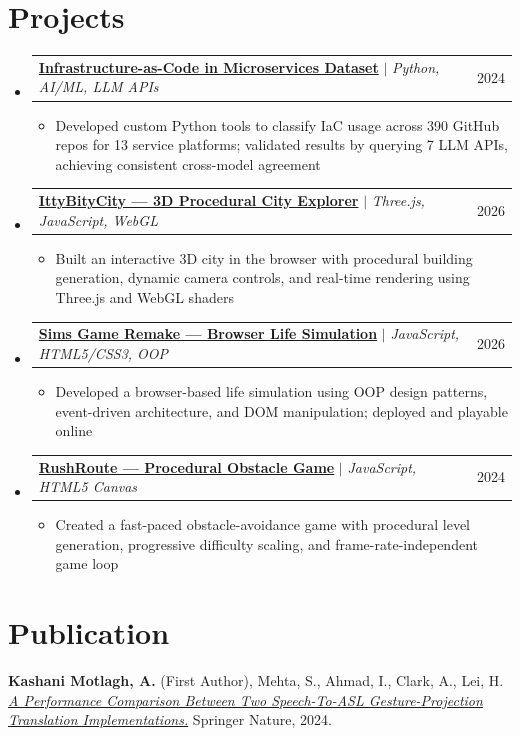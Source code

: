 \documentclass[letterpaper,10.5pt]{article}
\makeatletter
\newcommand{\resumeItem}[1]{
  \item\small{
    {#1 \vspace{-2pt}}
  }
}
\newcommand{\resumeProjectHeading}[2]{
    \item
    \begin{tabular*}{0.97\textwidth}{l@{\extracolsep{\fill}}r}
      \small#1 & #2 \\
    \end{tabular*}\vspace{-7pt}
}
\newcommand{\resumeSubHeadingListStart}{\begin{itemize}[leftmargin=0.15in, label={}]}
\newcommand{\resumeSubHeadingListEnd}{\end{itemize}}
\newcommand{\resumeItemListStart}{\begin{itemize}}
\newcommand{\resumeItemListEnd}{\end{itemize}\vspace{-5pt}}
\makeatother
\begin{document}
\section{Projects}
    \resumeSubHeadingListStart
      \resumeProjectHeading
          {\textbf{\href{https://github.com/kashmot2/FINALBASELINE}{Infrastructure-as-Code in Microservices Dataset}} $|$ \emph{Python, AI/ML, LLM APIs}}{2024}
          \resumeItemListStart
            \resumeItem{Developed custom Python tools to classify IaC usage across 390 GitHub repos for 13 service platforms; validated results by querying 7 LLM APIs, achieving consistent cross-model agreement}
          \resumeItemListEnd
      \resumeProjectHeading
          {\textbf{\href{https://github.com/kashmot2/ittybitycity}{IttyBityCity --- 3D Procedural City Explorer}} $|$ \emph{Three.js, JavaScript, WebGL}}{2026}
          \resumeItemListStart
            \resumeItem{Built an interactive 3D city in the browser with procedural building generation, dynamic camera controls, and real-time rendering using Three.js and WebGL shaders}
          \resumeItemListEnd
      \resumeProjectHeading
          {\textbf{\href{https://github.com/kashmot2/Sims}{Sims Game Remake --- Browser Life Simulation}} $|$ \emph{JavaScript, HTML5/CSS3, OOP}}{2026}
          \resumeItemListStart
            \resumeItem{Developed a browser-based life simulation using OOP design patterns, event-driven architecture, and DOM manipulation; deployed and playable online}
          \resumeItemListEnd
      \resumeProjectHeading
          {\textbf{\href{https://github.com/kashmot2/RushRoute}{RushRoute --- Procedural Obstacle Game}} $|$ \emph{JavaScript, HTML5 Canvas}}{2024}
          \resumeItemListStart
            \resumeItem{Created a fast-paced obstacle-avoidance game with procedural level generation, progressive difficulty scaling, and frame-rate-independent game loop}
          \resumeItemListEnd
    \resumeSubHeadingListEnd

\section{Publication}
 \begin{itemize}[leftmargin=0.15in, label={}]
    \small{\item{
     \textbf{Kashani Motlagh, A.} (First Author), Mehta, S., Ahmad, I., Clark, A., Lei, H.
     \href{https://scholarworks.utrgv.edu/cgi/viewcontent.cgi?article=1047&context=ies_fac}{\textit{A Performance Comparison Between Two Speech-To-ASL Gesture-Projection Translation Implementations.}}
     Springer Nature, 2024.
    }}
 \end{itemize}
\end{document}

